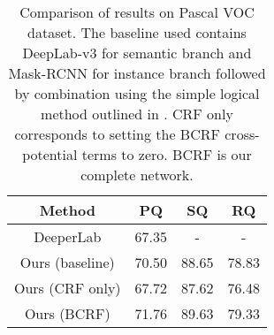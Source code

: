\begin{table}[]\centering
	\begin{tabular}{|c|c|c|c|}
		\hline
		\textbf{Method} & \textbf{PQ} & \textbf{SQ} & \textbf{RQ} \\ \hline
		DeeperLab \cite{deeperLab}      & 67.35       & -           & -           \\ \hline
		Ours (baseline) & 70.50       & 88.65       & 78.83       \\ \hline
		Ours (CRF only) & 67.72       & 87.62       & 76.48       \\ \hline
		Ours (BCRF)     & 71.76       & 89.63       & 79.33       \\ \hline
	\end{tabular}
	\vspace{-0.2cm}
	\caption[Comparison of results on Pascal VOC dataset]{Comparison of results on Pascal VOC dataset. The baseline used contains DeepLab-v3 for semantic branch and Mask-RCNN for instance branch followed by combination using the simple logical method outlined in \cite{panoptickirillov2017}. CRF only corresponds to setting the BCRF cross-potential terms to zero. BCRF is our complete network.}
	\label{tbl:pascal_e2e}
	\vspace{0.5cm}
\end{table}